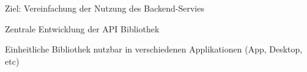 \begin{frame}

\begin{block}{}
	Ziel: Vereinfachung der Nutzung des Backend-Servies
\end{block}
\begin{block}{}
	Zentrale Entwicklung der API Bibliothek
\end{block}
\begin{block}{}
	Einheitliche Bibliothek nutzbar in verschiedenen Applikationen (App, Desktop, etc)
\end{block}

\end{frame}